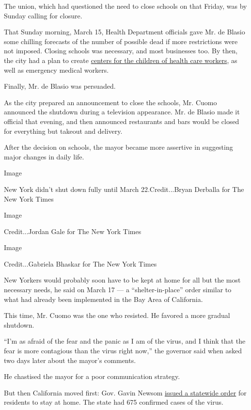 The union, which had questioned the need to close schools on that
Friday, was by Sunday calling for closure.

That Sunday morning, March 15, Health Department officials gave Mr. de
Blasio some chilling forecasts of the number of possible dead if more
restrictions were not imposed. Closing schools was necessary, and most
businesses too. By then, the city had a plan to create
\href{https://www.schools.nyc.gov/enrollment/enrollment-help/regional-enrichment-centers}{centers
for the children of health care workers}, as well as emergency medical
workers.

Finally, Mr. de Blasio was persuaded.

As the city prepared an announcement to close the schools, Mr. Cuomo
announced the shutdown during a television appearance. Mr. de Blasio
made it official that evening, and then announced restaurants and bars
would be closed for everything but takeout and delivery.

After the decision on schools, the mayor became more assertive in
suggesting major changes in daily life.

Image

New York didn't shut down fully until March 22.Credit...Bryan Derballa
for The New York Times

Image

Credit...Jordan Gale for The New York Times

Image

Credit...Gabriela Bhaskar for The New York Times

New Yorkers would probably soon have to be kept at home for all but the
most necessary needs, he said on March 17 --- a ``shelter-in-place''
order similar to what had already been implemented in the Bay Area of
California.

This time, Mr. Cuomo was the one who resisted. He favored a more gradual
shutdown.

``I'm as afraid of the fear and the panic as I am of the virus, and I
think that the fear is more contagious than the virus right now,'' the
governor said when asked two days later about the mayor's comments.

He chastised the mayor for a poor communication strategy.

But then California moved first: Gov. Gavin Newsom
\href{https://www.nytimes.com/2020/03/19/us/California-stay-at-home-order-virus.html}{issued
a statewide order} for residents to stay at home. The state had 675
confirmed cases of the virus.

